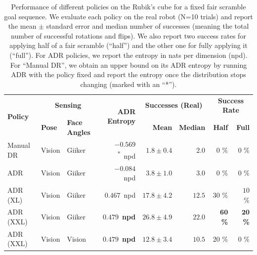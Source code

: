 \begin{table}[h]
    \caption{Performance of different policies on the Rubik's cube for a fixed fair scramble goal sequence. We evaluate each policy on the real robot (N=10 trials) and report the mean $\pm$ standard error and median number of successes (meaning the total number of successful rotations and flips). We also report two success rates for applying half of a fair scramble (``half'') and the other one for fully applying it (``full''). For ADR policies, we report the entropy in nats per dimension (npd). For ``Manual DR'', we obtain an upper bound on its ADR entropy by running ADR with the policy fixed and report the entropy once the distribution stops changing (marked with an ``*'').}
    \label{table:adr-full-transfer}
    \centering
    \renewcommand{\arraystretch}{1.3}
    \begin{tabular}{@{}lllr|rrrr@{}}
        \toprule
        \multirow{2}{*}{\textbf{Policy}} & \multicolumn{2}{c}{\textbf{Sensing}} & \multirow{2}{*}{\textbf{ADR Entropy}} & \multicolumn{2}{c}{\textbf{Successes (Real)}} & \multicolumn{2}{c}{\textbf{Success Rate}} \\
        & \textbf{Pose} & \textbf{Face Angles} & & \textbf{Mean} & \textbf{Median} & \textbf{Half} & \textbf{Full} \\
        \midrule
        Manual DR & Vision & Giiker & $-0.569$\textsuperscript{*}~npd & $1.8 \pm 0.4$ & $2.0$ & $0$ \% & $0$ \% \\
        ADR & Vision & Giiker & $-0.084$~npd & $3.8 \pm 1.0$ & $3.0$ & $0$ \% & $0$ \% \\
        \midrule
        ADR (XL) & Vision & Giiker & $0.467$~npd & $17.8 \pm 4.2$ & $12.5$ & $30$ \% & $10$ \% \\
        ADR (XXL) & Vision & Giiker & $\mathbf{0.479}$~\textbf{npd} & $\mathbf{26.8 \pm 4.9}$ & $\mathbf{22.0}$ & $\mathbf{60}$ \textbf{\%} & $\mathbf{20}$ \textbf{\%} \\
        \midrule
        ADR (XXL) & Vision & Vision & $\mathbf{0.479}$~\textbf{npd} & $12.8 \pm 3.4$ & $10.5$ & $20$ \% & $0$ \% \\
        \bottomrule
    \end{tabular}
\end{table}


